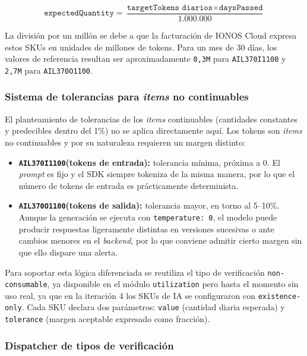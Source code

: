 \begin{equation}
    \texttt{expectedQuantity} = \frac{\texttt{targetTokens diarios} \times \texttt{daysPassed}}{1.000.000}
\end{equation}

La división por un millón se debe a que la facturación de IONOS Cloud expresa estos SKUs en unidades de millones de tokens. Para un mes de 30 días, los valores de referencia resultan ser aproximadamente \texttt{0{,}3M} para \texttt{AIL370I1100} y \texttt{2{,}7M} para \texttt{AIL370O1100}.

\subsubsection{Sistema de tolerancias para \textit{items} no continuables}

El planteamiento de tolerancias de los \textit{items} continuables (cantidades constantes y predecibles dentro del 1\%) no se aplica directamente aquí. Los tokens son \textit{items} no continuables y por su naturaleza requieren un margen distinto:

\begin{itemize}
    \item \textbf{\texttt{AIL370I1100}(tokens de entrada):} tolerancia mínima, próxima a 0. El \textit{prompt} es fijo y el SDK siempre tokeniza de la misma manera, por lo que el número de tokens de entrada es prácticamente determinista.
    \item \textbf{\texttt{AIL370O1100}(tokens de salida):} tolerancia mayor, en torno al 5--10\%. Aunque la generación se ejecuta con \texttt{temperature: 0}, el modelo puede producir respuestas ligeramente distintas en versiones sucesivas o ante cambios menores en el \textit{backend}, por lo que conviene admitir cierto margen sin que ello dispare una alerta.
\end{itemize}

Para soportar esta lógica diferenciada se reutiliza el tipo de verificación \texttt{non-consumable}, ya disponible en el módulo \texttt{utilization} pero hasta el momento sin uso real, ya que en la iteración 4 los SKUs de IA se configuraron con \texttt{existence-only}. Cada SKU declara dos parámetros: \texttt{value} (cantidad diaria esperada) y \texttt{tolerance} (margen aceptable expresado como fracción).

\subsubsection{Dispatcher de tipos de verificación}

